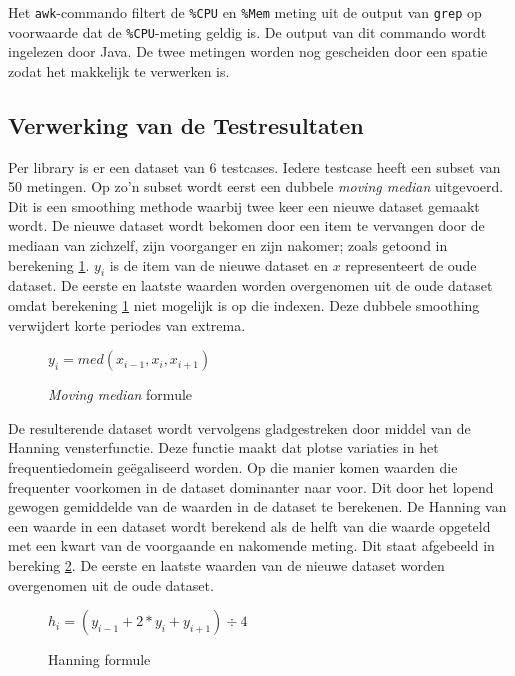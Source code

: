Het \verb+awk+-commando filtert de \verb+%CPU+ en \verb+%Mem+ meting uit de output van \verb+grep+ op voorwaarde dat de \verb+%CPU+-meting geldig is. De output van dit commando wordt ingelezen door Java. De twee metingen worden nog gescheiden door een spatie zodat het makkelijk te verwerken is.

\subsection{Verwerking van de Testresultaten}
\label{sec:methodologie:verwerking}

Per library is er een dataset van 6 testcases. Iedere testcase heeft een subset van 50 metingen. Op zo'n subset wordt eerst een dubbele \textit{moving median} uitgevoerd. \autocite{mediansmoothing} Dit is een smoothing methode waarbij twee keer een nieuwe dataset gemaakt wordt. De nieuwe dataset wordt bekomen door een item te vervangen door de mediaan van zichzelf, zijn voorganger en zijn nakomer; zoals getoond in berekening \ref{math:mediansmooth}. $y_{i}$ is de item van de nieuwe dataset en $x$ representeert de oude dataset. De eerste en laatste waarden worden overgenomen uit de oude dataset omdat berekening \ref{math:mediansmooth} niet mogelijk is op die indexen. Deze dubbele smoothing verwijdert korte periodes van extrema.

\begin{figure}
\centering
$y_{i} = med(x_{i-1}, x_{i}, x_{i+1})$
\caption{\textit{Moving median} formule}
\label{math:mediansmooth}
\end{figure}

De resulterende dataset wordt vervolgens gladgestreken door middel van de Hanning vensterfunctie. Deze functie maakt dat plotse variaties in het frequentiedomein geëgaliseerd worden. Op die manier komen waarden die frequenter voorkomen in de dataset dominanter naar voor. Dit door het lopend gewogen gemiddelde van de waarden in de dataset te berekenen. De Hanning van een waarde in een dataset wordt berekend als de helft van die waarde opgeteld met een kwart van de voorgaande en nakomende meting. Dit staat afgebeeld in bereking \ref{math:hanningformule}. De eerste en laatste waarden van de nieuwe dataset worden overgenomen uit de oude dataset. \autocite{hanning}

\begin{figure}
\centering
$h_{i} = (y_{i-1} + 2 \ast y_{i} + y_{i+1}) \div 4$
\caption{Hanning formule}
\label{math:hanningformule}
\end{figure}

